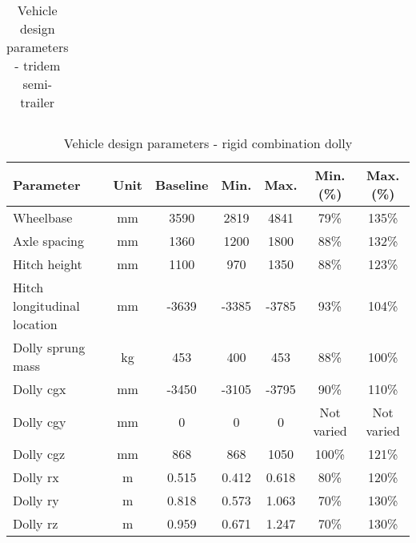 \begin{table}[H]
\begin{threeparttable}
\begin{tabulary}{\textwidth}{lcccccc}
			\bottomrule
		\end{tabulary}

		\caption{Vehicle design parameters - tridem semi-trailer}
		\label{table:vdp-range-trailer-rigid-combination-trailer}


	\end{threeparttable}
\end{table}

\begin{table}[H]
	\centering\footnotesize
	\begin{threeparttable}

		\begin{tabulary}{\textwidth}{lcccccc}
			\toprule
			\textbf{Parameter} & \textbf{Unit} & \textbf{Baseline} & \textbf{Min.} & \textbf{Max.} & \textbf{Min. (\%)} & \textbf{Max. (\%)} \\

			\midrule
			Wheelbase & mm    & 3590  & 2819  & 4841  & 79\%  & 135\% \\
			Axle spacing & mm    & 1360  & 1200  & 1800  & 88\%  & 132\% \\
			Hitch height & mm    & 1100  & 970   & 1350  & 88\%  & 123\% \\
			Hitch longitudinal location & mm    & -3639  & -3385  & -3785  & 93\%  & 104\% \\
			Dolly sprung mass & kg    & 453   & 400   & 453   & 88\%  & 100\% \\
			Dolly \gls{cgx} & mm    & -3450  & -3105  & -3795  & 90\%  & 110\% \\
			Dolly \gls{cgy} & mm    & 0     & 0     & 0     & Not varied & Not varied \\
			Dolly \gls{cgz} & mm    & 868   & 868   & 1050  & 100\% & 121\% \\
			Dolly \gls{rx} & m     & 0.515 & 0.412 & 0.618 & 80\%  & 120\% \\
			Dolly \gls{ry} & m     & 0.818 & 0.573 & 1.063 & 70\%  & 130\% \\
			Dolly \gls{rz} & m     & 0.959 & 0.671 & 1.247 & 70\%  & 130\% \\

			\bottomrule
		\end{tabulary}

		\caption{Vehicle design parameters - rigid combination dolly}
		\label{table:vdp-range-trailer-rigid-combination-dolly}


	\end{threeparttable}
\end{table}
